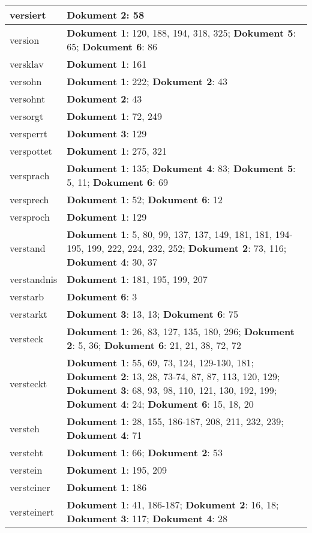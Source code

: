 \documentclass[a5paper]{article}
\begin{document}
\begin{longtable}[l]{|l|p{3in}|}
\hline
versiert & \textbf{Dokument 2}: 58 \\
\hline
version & \textbf{Dokument 1}: 120, 188, 194, 318, 325; \textbf{Dokument 5}: 65; \textbf{Dokument 6}: 86 \\
\hline
versklav & \textbf{Dokument 1}: 161 \\
\hline
versohn & \textbf{Dokument 1}: 222; \textbf{Dokument 2}: 43 \\
\hline
versohnt & \textbf{Dokument 2}: 43 \\
\hline
versorgt & \textbf{Dokument 1}: 72, 249 \\
\hline
versperrt & \textbf{Dokument 3}: 129 \\
\hline
verspottet & \textbf{Dokument 1}: 275, 321 \\
\hline
versprach & \textbf{Dokument 1}: 135; \textbf{Dokument 4}: 83; \textbf{Dokument 5}: 5, 11; \textbf{Dokument 6}: 69 \\
\hline
versprech & \textbf{Dokument 1}: 52; \textbf{Dokument 6}: 12 \\
\hline
versproch & \textbf{Dokument 1}: 129 \\
\hline
verstand & \textbf{Dokument 1}: 5, 80, 99, 137, 137, 149, 181, 181, 194-195, 199, 222, 224, 232, 252; \textbf{Dokument 2}: 73, 116; \textbf{Dokument 4}: 30, 37 \\
\hline
verstandnis & \textbf{Dokument 1}: 181, 195, 199, 207 \\
\hline
verstarb & \textbf{Dokument 6}: 3 \\
\hline
verstarkt & \textbf{Dokument 3}: 13, 13; \textbf{Dokument 6}: 75 \\
\hline
versteck & \textbf{Dokument 1}: 26, 83, 127, 135, 180, 296; \textbf{Dokument 2}: 5, 36; \textbf{Dokument 6}: 21, 21, 38, 72, 72 \\
\hline
versteckt & \textbf{Dokument 1}: 55, 69, 73, 124, 129-130, 181; \textbf{Dokument 2}: 13, 28, 73-74, 87, 87, 113, 120, 129; \textbf{Dokument 3}: 68, 93, 98, 110, 121, 130, 192, 199; \textbf{Dokument 4}: 24; \textbf{Dokument 6}: 15, 18, 20 \\
\hline
versteh & \textbf{Dokument 1}: 28, 155, 186-187, 208, 211, 232, 239; \textbf{Dokument 4}: 71 \\
\hline
versteht & \textbf{Dokument 1}: 66; \textbf{Dokument 2}: 53 \\
\hline
verstein & \textbf{Dokument 1}: 195, 209 \\
\hline
versteiner & \textbf{Dokument 1}: 186 \\
\hline
versteinert & \textbf{Dokument 1}: 41, 186-187; \textbf{Dokument 2}: 16, 18; \textbf{Dokument 3}: 117; \textbf{Dokument 4}: 28 \\

\end{longtable}
\end{document}
